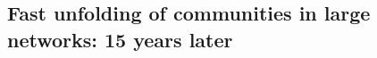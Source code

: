 \documentclass[../../main/main.tex]{subfiles}
\begin{document}
\subsection*{Fast unfolding of communities in large networks: 15 years later}

~\cite{Blondel24-10}

\printbibliography
\end{document}
